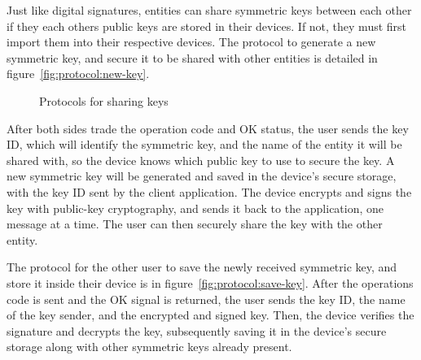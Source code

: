 \hfill
\hfill

Just like digital signatures, entities can share symmetric keys between each other if they each others public keys are stored in their devices. If not, they must first import them into their respective devices.
The protocol to generate a new symmetric key, and secure it to be shared with other entities is detailed in figure~\ref{fig:protocol:new-key}.

\begin{figure}[h]
	\centering     %
	\caption{Protocols for sharing keys}
\end{figure}

After both sides trade the operation code and OK status, the user sends the key ID, which will identify the symmetric key, and the name of the entity it will be shared with, so the device knows which public key to use to secure the key.
A new symmetric key will be generated and saved in the device's secure storage, with the key ID sent by the client application. The device encrypts and signs the key with public-key cryptography, and sends it back to the application, one message at a time. The user can then securely share the key with the other entity.

The protocol for the other user to save the newly received symmetric key, and store it inside their device is in figure~\ref{fig:protocol:save-key}.
After the operations code is sent and the OK signal is returned, the user sends the key ID, the name of the key sender, and the encrypted and signed key.
Then, the device verifies the signature and decrypts the key, subsequently saving it in the device's secure storage along with other symmetric keys already present.
